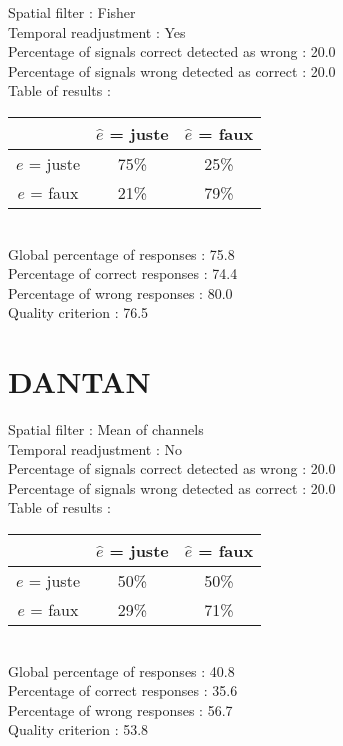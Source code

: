 Spatial filter : Fisher \\
Temporal readjustment : Yes \\
Percentage of signals correct detected as wrong :   20.0 \\
Percentage of signals wrong detected as correct :   20.0 \\
Table of results : \\
\begin{tabular}{|c|c|c|}
\hline				& $\hat{e}$ = juste & $\hat{e}$ = faux \\
\hline  $e$ = juste	&     75\%			&     25\%		\\
\hline  $e$ = faux	&     21\%			&     79\%		\\
\hline
\end{tabular}\\
Global percentage of responses :   75.8 \\
Percentage of correct responses :   74.4 \\
Percentage of wrong responses :   80.0 \\
Quality criterion :   76.5 \\

\section*{DANTAN}
Spatial filter : Mean of channels \\
Temporal readjustment : No \\
Percentage of signals correct detected as wrong :   20.0 \\
Percentage of signals wrong detected as correct :   20.0 \\
Table of results : \\
\begin{tabular}{|c|c|c|}
\hline				& $\hat{e}$ = juste & $\hat{e}$ = faux \\
\hline  $e$ = juste	&     50\%			&     50\%		\\
\hline  $e$ = faux	&     29\%			&     71\%		\\
\hline
\end{tabular}\\
Global percentage of responses :   40.8 \\
Percentage of correct responses :   35.6 \\
Percentage of wrong responses :   56.7 \\
Quality criterion :   53.8 \\

